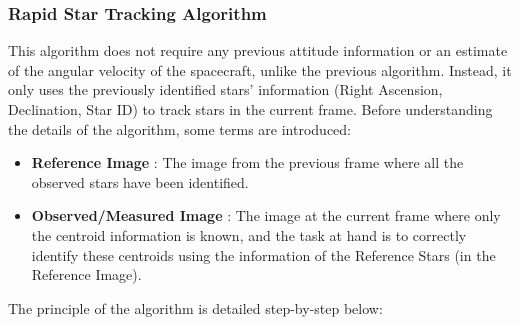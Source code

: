 \documentclass[../../main.tex]{subfiles}
\begin{document}
\subsubsection{Rapid Star Tracking Algorithm} \label{rapidtrack}
This algorithm does not require any previous attitude information or an estimate of the angular velocity of the spacecraft, unlike the previous algorithm. Instead, it only uses the previously identified stars' information (Right Ascension, Declination, Star ID) to track stars in the current frame. Before understanding the details of the algorithm, some terms are introduced:
\begin{itemize}
    \item \textbf{Reference Image} : The image from the previous frame where all the observed stars have been identified.
    \item \textbf{Observed/Measured Image} : The image at the current frame where only the centroid information is known, and the task at hand is to correctly identify these centroids using the information of the Reference Stars (in the Reference Image). 
\end{itemize}
The principle of the algorithm is detailed step-by-step below:
\end{document}

